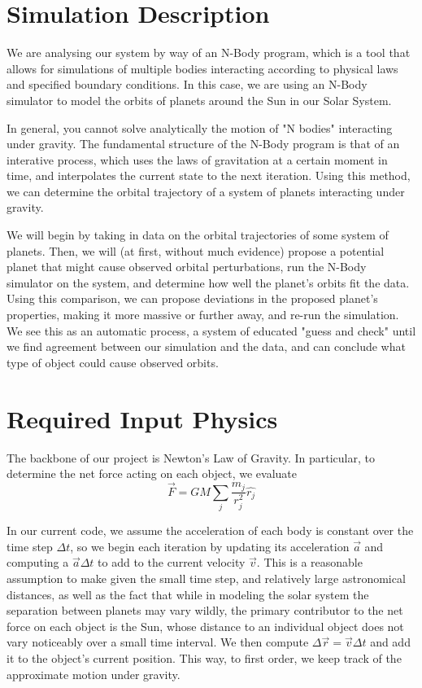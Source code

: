 \documentclass[a4paper,12pt]{article} %
\numberwithin{equation}{section} %
\numberwithin{figure}{section} %
\begin{document}
\section{Simulation Description}
We are analysing our system by way of an N-Body program, which is a tool
that allows for simulations of multiple bodies interacting according to physical laws and specified boundary
conditions. In this case, we are using an N-Body simulator to model the orbits of planets around the Sun in our Solar System.
\par
In general, you cannot solve analytically the motion of "N bodies" interacting under gravity. The fundamental structure of the N-Body program is that of an interative process, which uses the laws of gravitation at a certain moment in time, and interpolates the current state to the next iteration. Using this method, we can determine the orbital trajectory of a system of planets interacting under gravity.
\par
We will begin by taking in data on the orbital trajectories of some system of planets. Then, we will (at first, without much evidence) propose a potential planet that might cause observed orbital perturbations, run the N-Body simulator on the system, and determine how well the planet's orbits fit the data. Using this comparison, we can propose deviations in the proposed planet's properties, making it more massive or further away, and re-run the simulation. We see this as an automatic process, a system of educated "guess and check" until we find agreement between our simulation and the data, and can conclude what type of object could cause observed orbits.


\section{Required Input Physics}

The backbone of our project is Newton's Law of Gravity. In particular, to determine the net force acting on each object, we evaluate $$\vec{F}=GM\sum_{j}\frac{m_{j}}{r_{j}^2}\hat{r_j}$$

In our current code, we assume the acceleration of each body is constant over the time step $\Delta t$, so we begin each iteration by updating its acceleration $\vec{a}$ and computing a $\vec{a}\Delta t$ to add to the current velocity $\vec{v}$. This is a reasonable assumption to make given the small time step, and relatively large
astronomical distances, as well as the fact that while in modeling the solar system the separation between planets may vary wildly,
the primary contributor to the net force on each object is the Sun, whose distance to an individual object does not vary noticeably
over a small time interval. We then compute $\Delta \vec{r} = \vec{v}\Delta t$ and add it to the object's current position. This way, to first order, we keep track of the approximate motion under gravity.
\end{document}
